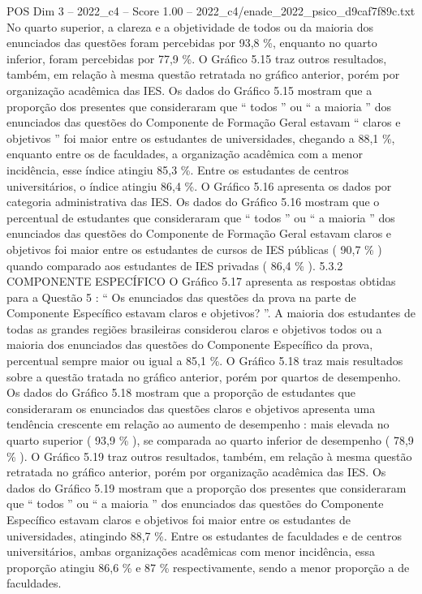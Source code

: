 \begin{textsample}{POS Dim 3 – 2022\_c4 – Score 1.00 – 2022\_c4/enade\_2022\_psico\_d9caf7f89c.txt}
No quarto superior, a clareza e a objetividade de todos ou da maioria dos enunciados das questões foram percebidas por 93,8 \%, enquanto no quarto inferior, foram percebidas por 77,9 \%.
O Gráfico 5.15 traz outros resultados, também, em relação à mesma questão retratada no gráfico anterior, porém por organização acadêmica das IES.
Os dados do Gráfico 5.15 mostram que a proporção dos presentes que consideraram que “ todos ” ou “ a maioria ” dos enunciados das questões do Componente de Formação Geral estavam “ claros e objetivos ” foi maior entre os estudantes de universidades, chegando a 88,1 \%, enquanto entre os de faculdades, a organização acadêmica com a menor incidência, esse índice atingiu 85,3 \%.
Entre os estudantes de centros universitários, o índice atingiu 86,4 \%.
O Gráfico 5.16 apresenta os dados por categoria administrativa das IES.
Os dados do Gráfico 5.16 mostram que o percentual de estudantes que consideraram que “ todos ” ou “ a maioria ” dos enunciados das questões do Componente de Formação Geral estavam claros e objetivos foi maior entre os estudantes de cursos de IES públicas ( 90,7 \% ) quando comparado aos estudantes de IES privadas ( 86,4 \% ). 5.3.2 COMPONENTE ESPECÍFICO O Gráfico 5.17 apresenta as respostas obtidas para a Questão 5 : “ Os enunciados das questões da prova na parte de Componente Específico estavam claros e objetivos? ”.
A maioria dos estudantes de todas as grandes regiões brasileiras considerou claros e objetivos todos ou a maioria dos enunciados das questões do Componente Específico da prova, percentual sempre maior ou igual a 85,1 \%.
O Gráfico 5.18 traz mais resultados sobre a questão tratada no gráfico anterior, porém por quartos de desempenho.
Os dados do Gráfico 5.18 mostram que a proporção de estudantes que consideraram os enunciados das questões claros e objetivos apresenta uma tendência crescente em relação ao aumento de desempenho : mais elevada no quarto superior ( 93,9 \% ), se comparada ao quarto inferior de desempenho ( 78,9 \% ).
O Gráfico 5.19 traz outros resultados, também, em relação à mesma questão retratada no gráfico anterior, porém por organização acadêmica das IES.
Os dados do Gráfico 5.19 mostram que a proporção dos presentes que consideraram que “ todos ” ou “ a maioria ” dos enunciados das questões do Componente Específico estavam claros e objetivos foi maior entre os estudantes de universidades, atingindo 88,7 \%.
Entre os estudantes de faculdades e de centros universitários, ambas organizações acadêmicas com menor incidência, essa proporção atingiu 86,6 \% e 87 \% respectivamente, sendo a menor proporção a de faculdades.

\end{textsample}
